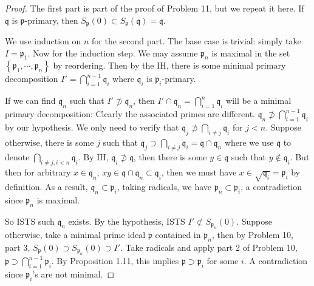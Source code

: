 \documentclass{solution}
\begin{document}
\begin{proof}
    The first part is part of the proof of Problem 11, but we repeat it here. If $\mathfrak{q}$ is $\mathfrak{p}$-primary, then $S_{\mathfrak{p}}(0) \subset S_{\mathfrak{p}}(\mathfrak{q}) = \mathfrak{q}$.

    We use induction on $n$ for the second part. The base case is trivial: simply take $I = \mathfrak{p}_1$. Now for the induction step. We may assume $\mathfrak{p}_n$ is maximal in the set $\left\lbrace \mathfrak{p}_1, \cdots, \mathfrak{p}_n \right\rbrace$ by reordering. Then by the IH, there is some minimal primary decomposition $I' = \bigcap\limits_{i = 1}^{n - 1} \mathfrak{q}_i$ where $\mathfrak{q}_i$ is $\mathfrak{p}_i$-primary.

    If we can find $\mathfrak{q}_n$ such that $I' \not \supset \mathfrak{q}_n$, then $I' \cap \mathfrak{q}_n = \bigcap\limits_{i = 1}^{n} \mathfrak{q}_i$ will be a minimal primary decomposition: Clearly the associated primes are different. $\mathfrak{q}_n \not\supset \bigcap\limits_{i = 1}^{n - 1} \mathfrak{q}_i$ by our hypothesis. We only need to verify that $\mathfrak{q}_j \not\supset \bigcap\limits_{i \ne j} \mathfrak{q}_i$ for $j \lt n$. Suppose otherwise, there is some $j$ such that $\mathfrak{q}_j \supset \bigcap\limits_{i \ne j} \mathfrak{q}_i = \mathfrak{q} \cap \mathfrak{q}_n$ where we use $\mathfrak{q}$ to denote $\bigcap\limits_{i \ne j, i \lt n} \mathfrak{q}_i$. By IH, $\mathfrak{q}_i \not\supset \mathfrak{q}$, then there is some $y \in \mathfrak{q}$ such that $y \notin \mathfrak{q}_i$. But then for arbitrary $x \in \mathfrak{q}_n$, $xy \in \mathfrak{q} \cap \mathfrak{q}_n \subset \mathfrak{q}_i$, then we must have $x \in \sqrt{\mathfrak{q}_i} = \mathfrak{p}_i$ by definition. As a result, $\mathfrak{q}_n \subset \mathfrak{p}_i$, taking radicals, we have $\mathfrak{p}_n \subset \mathfrak{p}_i$, a contradiction since $\mathfrak{p}_n$ is maximal.

    So ISTS such $\mathfrak{q}_n$ exists. By the hypothesis, ISTS $I' \not\subset S_{\mathfrak{p}_n}(0)$. Suppose otherwise, take a minimal prime ideal $\mathfrak{p}$ contained in $\mathfrak{p}_n$, then by Problem 10, part 3, $S_{\mathfrak{p}}(0) \supset S_{\mathfrak{p}_n}(0) \supset I'$. Take radicals and apply part 2 of Problem 10, $\mathfrak{p} \supset \bigcap\limits_{i = 1}^{n - 1} \mathfrak{p}_i$. By Proposition 1.11, this implies $\mathfrak{p} \supset \mathfrak{p}_i$ for some $i$. A contradiction since $\mathfrak{p}_i$'s are not minimal.
\end{proof}
\end{document}
